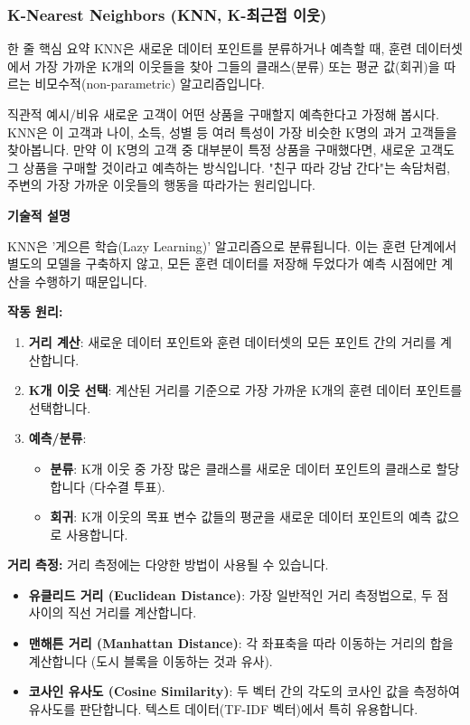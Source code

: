 \documentclass[11pt,a4paper]{article}
\begin{document}
\subsubsection{K-Nearest Neighbors (KNN, K-최근접 이웃)}

\begin{summarybox}{한 줄 핵심 요약}
KNN은 새로운 데이터 포인트를 분류하거나 예측할 때, 훈련 데이터셋에서 가장 가까운 K개의 이웃들을 찾아 그들의 클래스(분류) 또는 평균 값(회귀)을 따르는 비모수적(non-parametric) 알고리즘입니다.
\end{summarybox}

\begin{examplebox}{직관적 예시/비유}
새로운 고객이 어떤 상품을 구매할지 예측한다고 가정해 봅시다. KNN은 이 고객과 나이, 소득, 성별 등 여러 특성이 가장 비슷한 K명의 과거 고객들을 찾아봅니다. 만약 이 K명의 고객 중 대부분이 특정 상품을 구매했다면, 새로운 고객도 그 상품을 구매할 것이라고 예측하는 방식입니다. "친구 따라 강남 간다"는 속담처럼, 주변의 가장 가까운 이웃들의 행동을 따라가는 원리입니다.
\end{examplebox}

\textbf{기술적 설명}

KNN은 '게으른 학습(Lazy Learning)' 알고리즘으로 분류됩니다. 이는 훈련 단계에서 별도의 모델을 구축하지 않고, 모든 훈련 데이터를 저장해 두었다가 예측 시점에만 계산을 수행하기 때문입니다.

\textbf{작동 원리:}
\begin{enumerate}
    \item \textbf{거리 계산}: 새로운 데이터 포인트와 훈련 데이터셋의 모든 포인트 간의 거리를 계산합니다.
    \item \textbf{K개 이웃 선택}: 계산된 거리를 기준으로 가장 가까운 K개의 훈련 데이터 포인트를 선택합니다.
    \item \textbf{예측/분류}:
        \begin{itemize}
            \item \textbf{분류}: K개 이웃 중 가장 많은 클래스를 새로운 데이터 포인트의 클래스로 할당합니다 (다수결 투표).
            \item \textbf{회귀}: K개 이웃의 목표 변수 값들의 평균을 새로운 데이터 포인트의 예측 값으로 사용합니다.
        \end{itemize}
\end{enumerate}

\textbf{거리 측정:}
거리 측정에는 다양한 방법이 사용될 수 있습니다.
\begin{itemize}
    \item \textbf{유클리드 거리 (Euclidean Distance)}: 가장 일반적인 거리 측정법으로, 두 점 사이의 직선 거리를 계산합니다.
    \item \textbf{맨해튼 거리 (Manhattan Distance)}: 각 좌표축을 따라 이동하는 거리의 합을 계산합니다 (도시 블록을 이동하는 것과 유사).
    \item \textbf{코사인 유사도 (Cosine Similarity)}: 두 벡터 간의 각도의 코사인 값을 측정하여 유사도를 판단합니다. 텍스트 데이터(TF-IDF 벡터)에서 특히 유용합니다.
\end{itemize}
\end{document}
